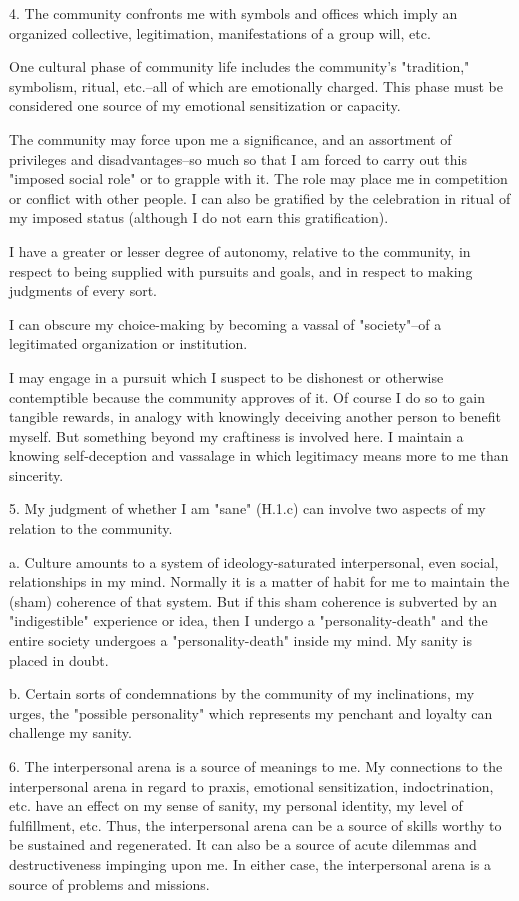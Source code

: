 4. The community confronts me with symbols and offices which imply an organized collective, legitimation, manifestations of a group will, etc.

One cultural phase of community life includes the community's "tradition," symbolism, ritual, etc.--all of which are emotionally charged. This phase must be considered one source of my emotional sensitization or capacity.

The community may force upon me a significance, and an assortment of privileges and disadvantages--so much so that I am forced to carry out this "imposed social role" or to grapple with it. The role may place me in competition or conflict with other people. I can also be gratified by the celebration in ritual of my imposed status (although I do not earn this gratification).

I have a greater or lesser degree of autonomy, relative to the community, in respect to being supplied with pursuits and goals, and in respect to making judgments of every sort.

I can obscure my choice-making by becoming a vassal of "society"--of a legitimated organization or institution.

I may engage in a pursuit which I suspect to be dishonest or otherwise contemptible because the community approves of it. Of course I do so to gain tangible rewards, in analogy with knowingly deceiving another person to benefit myself. But something beyond my craftiness is involved here. I maintain a knowing self-deception and vassalage in which legitimacy means more to me than sincerity.

5. My judgment of whether I am "sane" (H.1.c) can involve two aspects of my relation to the community.

a. Culture amounts to a system of ideology-saturated interpersonal, even social, relationships in my mind. Normally it is a matter of habit for me to maintain the (sham) coherence of that system. But if this sham coherence is subverted by an "indigestible" experience or idea, then I undergo a "personality-death" and the entire society undergoes a "personality-death" inside my mind. My sanity is placed in doubt.

b. Certain sorts of condemnations by the community of my inclinations, my urges, the "possible personality" which represents my penchant and loyalty can challenge my sanity.

6. The interpersonal arena is a source of meanings to me. My connections to the interpersonal arena in regard to praxis, emotional sensitization, indoctrination, etc. have an effect on my sense of sanity, my personal identity, my level of fulfillment, etc. Thus, the interpersonal arena can be a source of skills worthy to be sustained and regenerated. It can also be a source of acute dilemmas and destructiveness impinging upon me. In either case, the interpersonal arena is a source of problems and missions.

